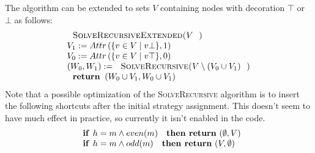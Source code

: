 The algorithm can be extended to sets $V$ containing nodes with decoration $%
\top $ or $\bot $ as follows:%
\begin{equation*}
\begin{array}{l}
\text{\textsc{SolveRecursiveExtended(}}V\text{\textsc{)}} \\ 
V_{1}:=Attr\left( \{v\in V\mid v\bot \},1\right) \\ 
V_{0}:=Attr\left( \{v\in V\mid v\top \},0\right) \\ 
\left( W_{0},W_{1}\right) :=\text{\textsc{SolveRecursive(}}V\setminus
(V_{0}\cup V_{1})\text{\textsc{)}} \\ 
\text{\textbf{return }}\left( W_{0}\cup V_{1},W_{0}\cup V_{1}\right)%
\end{array}%
\end{equation*}%
Note that a possible optimization of the \textsc{SolveRecursive} algorithm
is to insert the following shortcuts after the initial strategy assignment.
This doesn't seem to have much effect in practice, so currently it isn't
enabled in the code.%
\begin{equation*}
\begin{array}{l}
\text{\textbf{if }}h=m\wedge even(m)\text{ \textbf{then return} }(\emptyset
,V) \\ 
\text{\textbf{if }}h=m\wedge odd(m)\text{ \textbf{then return} }(V,\emptyset
)%
\end{array}%
\end{equation*}%
\newpage
